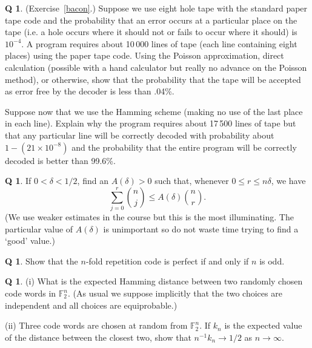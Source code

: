 \documentclass[12pt,a4paper]{article}
\theoremstyle{plain}
\theoremstyle{definition}
\newtheorem{question}[theorem]{Q}
\begin{document}
    \begin{question}
        \label{C2.4}
        (Exercise~\ref{bacon}.)
        Suppose we use eight hole tape with
        the standard paper tape code
        and the probability that an error occurs at a particular
        place on the tape (i.e. a hole occurs where it should
        not or fails to occur where it should) is $10^{-4}$.
        A program requires about 10\,000 lines of tape
        (each line containing eight places)
        using the paper tape code. Using
        the Poisson approximation, direct calculation
        (possible with a hand calculator but really no
        advance on the Poisson method), or otherwise,
        show that the probability that the tape
        will be accepted as error free by the decoder
        is less than .04\%.

        Suppose now that we use the Hamming scheme
        (making no use of the last place in each line).
        Explain why the program requires about
        17\,500 lines of tape but that any
        particular line will be correctly decoded
        with probability about $1-(21\times 10^{-8})$
        and the probability that the entire program
        will be correctly decoded is better than
        99.6\%.
    \end{question}
    \begin{question}
        \label{C2.5}
        If $0<\delta<1/2$,
        find an $A(\delta)>0$ such that, whenever
        $0\leq r\leq n\delta$, we have
        \[\sum_{j=0}^{r}\binom{n}{j}\leq A(\delta)\binom{n}{r}.\]
        (We use weaker estimates in the course but this is
        the most illuminating. The particular value of $A(\delta)$
        is unimportant so do not waste time trying to find
        a `good' value.)
    \end{question}
    \begin{question}
        \label{C2.6}
        Show that the $n$-fold repetition code
        is perfect if and only if $n$ is odd.
    \end{question}
    \begin{question}
        \label{C2.7}
        (i) What is the expected Hamming distance
        between two randomly chosen code words in ${\mathbb F}_{2}^{n}$.
        (As usual we suppose implicitly that the two choices are independent
        and all choices are equiprobable.)

        (ii) Three code words are chosen at random
        from ${\mathbb F}_{2}^{n}$. If $k_{n}$ is
        the expected value of the distance between the
        closest two,
        show that $n^{-1}k_{n}\rightarrow 1/2$ as
        $n\rightarrow\infty$.

    \end{question}
\end{document}
